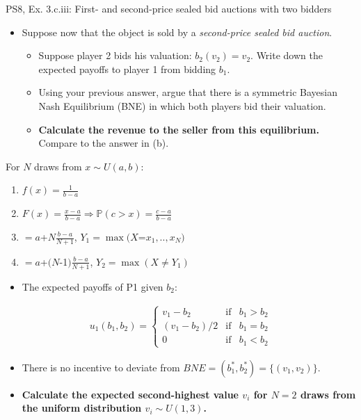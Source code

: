 \begin{frame}{PS8, Ex. 3.c.iii: First- and second-price sealed bid auctions with two bidders}
    \begin{multicols}{2}
      \begin{itemize}
        \item[(c)] Suppose now that the object is sold by a \textit{second-price sealed bid auction}.
        \begin{itemize}\normalsize
          \item[i.]   Suppose player 2 bids his valuation: $b_2(v_2) = v_2$. Write down the expected payoffs to player 1 from bidding $b_1$.
          \item[ii.]  Using your previous answer, argue that there is a symmetric Bayesian Nash Equilibrium (BNE) in which both players bid their valuation.
          \item[iii.] \textbf{Calculate the revenue to the seller from this equilibrium.} Compare to the answer in (b).
        \end{itemize}
      \end{itemize}
      For $N$ draws from $x\sim U(a, b):$
      \vspace{-6pt}
      \begin{enumerate}
        \item[PDF:] $f(x)=\frac{1}{b-a}$
        \item[CDF:] $F(x)=\frac{x-a}{b-a}\Rightarrow\mathbb{P}(c>x)=\frac{c-a}{b-a}$
        \item[$\mathbb{E}(Y_1)$] $=a$+$N\frac{b-a}{N+1}$, $Y_1=\max(X$=$x_1,..,x_N)$
        \item[$\mathbb{E}(Y_2)$] $=a$+$(N$-1$)\frac{b-a}{N+1}$, $Y_2=\max(X\neq Y_1)$
      \end{enumerate}
      \vfill\null\columnbreak
      \begin{itemize}
        \item[(i)] The expected payoffs of P1 given $b_2$:
      \end{itemize}
      \vspace{-16pt}
      \begin{align*}
        u_1(b_1,b_2)=\left\{\begin{array}{lcl}
          v_1-b_2     & \text{if} & b_1>b_2 \\
          (v_1-b_2)/2 & \text{if} & b_1=b_2 \\
          0           & \text{if} & b_1<b_2
        \end{array}\right.
      \end{align*}
      \vspace{-18pt}
      \begin{itemize}
        \item[(ii)] There is no incentive to deviate from $BNE=(b_1^*,b_2^*)=\{(v_1,v_2)\}$.
        \item[(iii)] \textbf{Calculate the expected second-highest value $v_i$ for $N=2$ draws from the uniform distribution $v_i\sim U(1,3)$.}
      \end{itemize}
      \vfill\null
    \end{multicols}
\end{frame}
